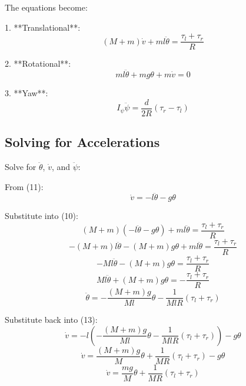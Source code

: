 \documentclass{article}
\begin{document}
The equations become:

1. **Translational**:
\begin{equation}
    (M + m) \dot{v} + m l \ddot{\theta} = \frac{\tau_l + \tau_r}{R}
\end{equation}

2. **Rotational**:
\begin{equation}
    m l \ddot{\theta} + m g \theta + m \dot{v} = 0
\end{equation}

3. **Yaw**:
\begin{equation}
    I_\psi \ddot{\psi} = \frac{d}{2 R} (\tau_r - \tau_l)
\end{equation}

\subsection{Solving for Accelerations}

Solve for \( \ddot{\theta} \), \( \dot{v} \), and \( \ddot{\psi} \):

From (11):
\begin{equation}
    \dot{v} = -l \ddot{\theta} - g \theta
\end{equation}

Substitute into (10):
\begin{equation}
    (M + m) (-l \ddot{\theta} - g \theta) + m l \ddot{\theta} = \frac{\tau_l + \tau_r}{R}
\end{equation}
\begin{equation}
    -(M + m) l \ddot{\theta} - (M + m) g \theta + m l \ddot{\theta} = \frac{\tau_l + \tau_r}{R}
\end{equation}
\begin{equation}
    -M l \ddot{\theta} - (M + m) g \theta = \frac{\tau_l + \tau_r}{R}
\end{equation}
\begin{equation}
    M l \ddot{\theta} + (M + m) g \theta = -\frac{\tau_l + \tau_r}{R}
\end{equation}
\begin{equation}
    \ddot{\theta} = -\frac{(M + m) g}{M l} \theta - \frac{1}{M l R} (\tau_l + \tau_r)
\end{equation}

Substitute back into (13):
\begin{equation}
    \dot{v} = -l \left( -\frac{(M + m) g}{M l} \theta - \frac{1}{M l R} (\tau_l + \tau_r) \right) - g \theta
\end{equation}
\begin{equation}
    \dot{v} = \frac{(M + m) g}{M} \theta + \frac{1}{M R} (\tau_l + \tau_r) - g \theta
\end{equation}
\begin{equation}
    \dot{v} = \frac{m g}{M} \theta + \frac{1}{M R} (\tau_l + \tau_r)
\end{equation}
\end{document}
